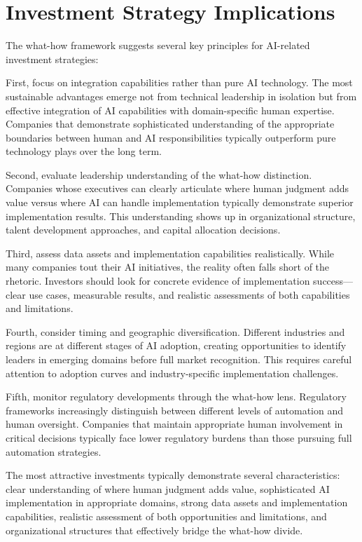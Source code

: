\documentclass[
  Letterpaper,
]{scrbook}
\begin{document}
\section{\texorpdfstring{Investment
Strategy
Implications}{Investment Strategy Implications}}\label{investment-strategy-implications}

The what-how framework suggests several key principles for AI-related
investment strategies:

First, focus on integration capabilities rather than pure AI technology.
The most sustainable advantages emerge not from technical leadership in
isolation but from effective integration of AI capabilities with
domain-specific human expertise. Companies that demonstrate
sophisticated understanding of the appropriate boundaries between human
and AI responsibilities typically outperform pure technology plays over
the long term.

Second, evaluate leadership understanding of the what-how distinction.
Companies whose executives can clearly articulate where human judgment
adds value versus where AI can handle implementation typically
demonstrate superior implementation results. This understanding shows up
in organizational structure, talent development approaches, and capital
allocation decisions.

Third, assess data assets and implementation capabilities realistically.
While many companies tout their AI initiatives, the reality often falls
short of the rhetoric. Investors should look for concrete evidence of
implementation success---clear use cases, measurable results, and
realistic assessments of both capabilities and limitations.

Fourth, consider timing and geographic diversification. Different
industries and regions are at different stages of AI adoption, creating
opportunities to identify leaders in emerging domains before full market
recognition. This requires careful attention to adoption curves and
industry-specific implementation challenges.

Fifth, monitor regulatory developments through the what-how lens.
Regulatory frameworks increasingly distinguish between different levels
of automation and human oversight. Companies that maintain appropriate
human involvement in critical decisions typically face lower regulatory
burdens than those pursuing full automation strategies.

The most attractive investments typically demonstrate several
characteristics: clear understanding of where human judgment adds value,
sophisticated AI implementation in appropriate domains, strong data
assets and implementation capabilities, realistic assessment of both
opportunities and limitations, and organizational structures that
effectively bridge the what-how divide.
\end{document}
